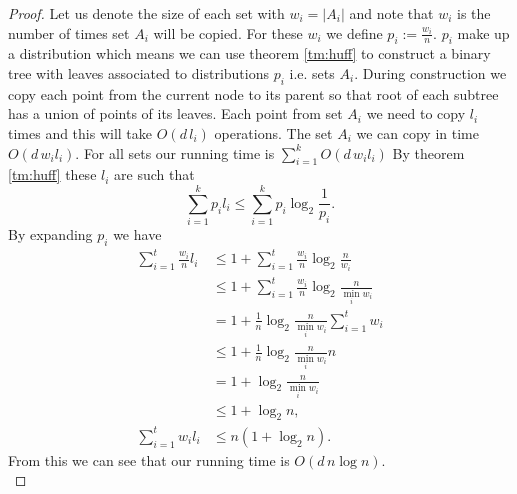 \documentclass[a4paper,UKenglish,cleveref, autoref, thm-restate]{lipics-v2021}
\begin{document}
\begin{proof}
Let us denote the size of each set with $w_i = |A_i|$ and note that $w_i$ is the number of times set $A_i$ will be copied.
For these $w_i$ we define $p_i := \frac{w_i}{n}$.
$p_i$ make up a distribution which means we can use theorem \ref{tm:huff} to construct a binary tree with leaves associated to distributions $p_i$ i.e. sets $A_i$.
During construction we copy each point from the current node to its parent so that root of each subtree has a union of points of its leaves.
Each point from set $A_i$ we need to copy $l_i$ times and this will take $O(d\, l_i)$ operations.
The set $A_i$ we can copy in time $O(d\, w_il_i)$.
For all sets our running time is $ \sum \limits_{i=1}^k O(d\,w_i l_i)$
 By theorem \ref{tm:huff} these $l_i$ are such that
$$ \sum \limits_{i = 1}^k p_i l_i \leq \sum \limits_{i = 1}^k p_i \log_2 \frac{1}{p_i}. $$
By expanding $p_i$ we have
\begin{align*}
	\sum \limits_{i = 1}^t \frac{w_i}{n} l_i
	&\leq 1 + \sum \limits_{i = 1}^t \frac{w_i}{n} \log_2 \frac{n}{w_i} \\
	&\leq 1 + \sum \limits_{i = 1}^t \frac{w_i}{n}\log_2 \frac{n}{\min \limits_{i} w_i} \\
	&= 1 + \frac{1}{n}\log_2 \frac{n}{\min \limits_i w_i} \sum \limits_{i = 1}^t w_i \\
	&\leq 1 + \frac{1}{n}\log_2 \frac{n}{\min \limits_i w_i} n \\
	&= 1 + \log_2 \frac{n}{\min \limits_i w_i} \\
	&\leq 1 + \log_2 n, \\ 
	\sum \limits_{i=1}^t w_i l_i &\leq n \left(1 + \log_2 n\right).
\end{align*}
From this we can see that our running time is $O\left(d\,n \log n\right)$.\\
\end{proof}
\end{document}
